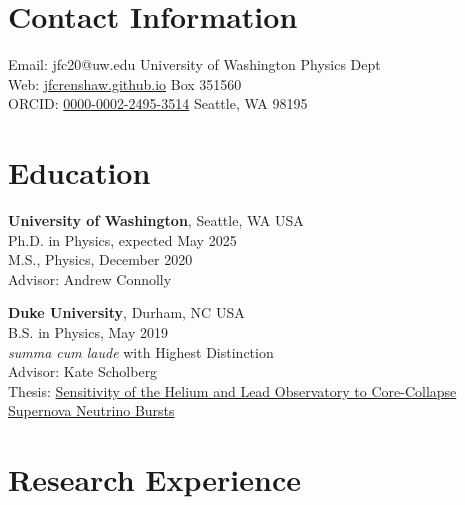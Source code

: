 \documentclass[margin]{res}
\begin{document}

\begin{resume}

\section{Contact Information}
{Email: jfc20@uw.edu            \hfill University of Washington Physics Dept \\
Web: \href{https://jfcrenshaw.github.io}{jfcrenshaw.github.io}       \hfill Box 351560 \\
ORCID: \href{https://orcid.org/0000-0002-2495-3514} {0000-0002-2495-3514}     \hfill Seattle, WA 98195}

\section{Education}

\textbf{University of Washington}, Seattle, WA USA\\
Ph.D. in Physics, expected May 2025\\
M.S., Physics, December 2020\\
Advisor: Andrew Connolly

\textbf{Duke University}, Durham, NC USA \\
B.S. in Physics, May 2019\\
\textit{summa cum laude} with Highest Distinction \\
Advisor: Kate Scholberg \\
Thesis: \href{https://jfcrenshaw.github.io/assets/thesis-duke.pdf}{Sensitivity of the Helium and Lead Observatory to Core-Collapse \\ \hspace*{11.4mm} Supernova Neutrino Bursts}

\section{Research Experience}


\end{resume}
\end{document}
